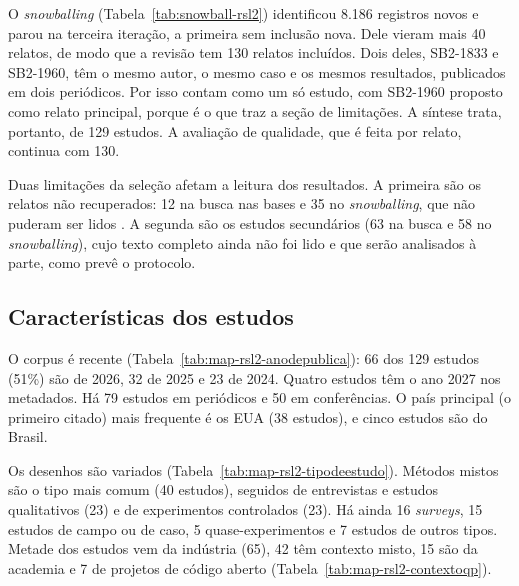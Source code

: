 O \textit{snowballing} (Tabela~\ref{tab:snowball-rsl2}) identificou 8.186
registros novos e parou na terceira iteração, a primeira sem inclusão nova.
Dele vieram mais 40 relatos, de modo que a revisão tem 130 relatos incluídos.
Dois deles, SB2-1833 e SB2-1960, têm o mesmo autor, o mesmo caso e os mesmos
resultados, publicados em dois periódicos. Por isso contam como um só estudo,
com SB2-1960 proposto como relato principal, porque é o que traz a seção
de limitações. A síntese trata, portanto, de 129 estudos. A avaliação de
qualidade, que é feita por relato, continua com 130.

Duas limitações da seleção afetam a leitura dos resultados. A primeira são os
relatos não recuperados: 12 na busca nas bases e 35 no
\textit{snowballing}, que não puderam ser lidos \cite[item 23c]{page2021ee}.
A segunda são os estudos secundários (63 na busca e 58 no
\textit{snowballing}), cujo texto completo ainda não foi lido e que serão
analisados à parte, como prevê o protocolo.

\subsection{Características dos estudos}
\label{sec:resultados-rsl2-mapeamento}



O corpus é recente (Tabela~\ref{tab:map-rsl2-anodepublica}): 66 dos 129
estudos (51\%) são de 2026, 32 de 2025 e 23 de 2024. Quatro estudos têm o ano
2027 nos metadados. Há 79 estudos em periódicos e 50 em conferências. O país
principal (o primeiro citado) mais frequente é os EUA (38 estudos), e cinco
estudos são do Brasil.

Os desenhos são variados (Tabela~\ref{tab:map-rsl2-tipodeestudo}). Métodos
mistos são o tipo mais comum (40 estudos), seguidos de entrevistas e estudos
qualitativos (23) e de experimentos controlados (23). Há ainda 16
\textit{surveys}, 15 estudos de campo ou de caso, 5 quase-experimentos e 7
estudos de outros tipos. Metade dos estudos vem da indústria (65), 42 têm
contexto misto, 15 são da academia e 7 de projetos de código aberto
(Tabela~\ref{tab:map-rsl2-contextoqp}).

